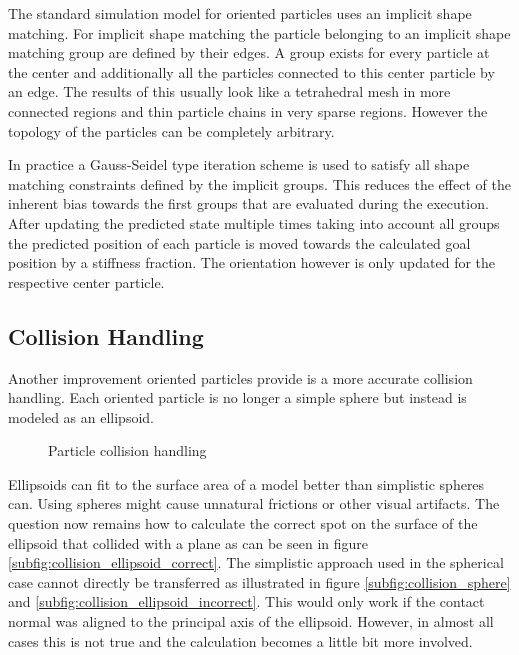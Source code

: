 The standard simulation model for oriented particles uses an implicit shape matching. For implicit shape matching the particle belonging to an implicit shape matching group are defined by their edges. A group exists for every particle at the center and additionally all the particles connected to this center particle by an edge. The results of this usually look like a tetrahedral mesh in more connected regions and thin particle chains in very sparse regions. However the topology of the particles can be completely arbitrary.

In practice a Gauss-Seidel type iteration scheme is used to satisfy all shape matching constraints defined by the implicit groups. This reduces the effect of the inherent bias towards the first groups that are evaluated during the execution. After updating the predicted state multiple times taking into account all groups the predicted position of each particle is moved towards the calculated goal position by a stiffness fraction. The orientation however is only updated for the respective center particle.

\subsection{Collision Handling}
\label{subsec:collision_handling}

Another improvement oriented particles provide is a more accurate collision handling. Each oriented particle is no longer a simple sphere but instead is modeled as an ellipsoid.

\begin{figure}[htb]
	\centering
	\caption{Particle collision handling}
	\label{fig:collision_handling}
\end{figure}

Ellipsoids can fit to the surface area of a model better than simplistic spheres can. Using spheres might cause unnatural frictions or other visual artifacts. The question now remains how to calculate the correct spot on the surface of the ellipsoid that collided with a plane as can be seen in figure \ref{subfig:collision_ellipsoid_correct}. The simplistic approach used in the spherical case cannot directly be transferred as illustrated in figure \ref{subfig:collision_sphere} and \ref{subfig:collision_ellipsoid_incorrect}. This would only work if the contact normal was aligned to the principal axis of the ellipsoid. However, in almost all cases this is not true and the calculation becomes a little bit more involved.

